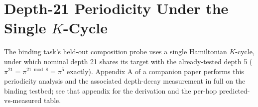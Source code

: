 \section{Depth-21 Periodicity Under the Single $K$-Cycle}
\label{app:period}

The binding task's held-out composition probe uses a single Hamiltonian
$K$-cycle, under which nominal depth 21 shares its target with the
already-tested depth 5 ($\pi^{21} = \pi^{21 \bmod 8} = \pi^5$ exactly).
Appendix A of a companion paper \citep{larson2026companion} performs
this periodicity analysis and the associated depth-decay measurement in
full on the binding testbed; see that appendix for the derivation and
the per-hop predicted-vs-measured table.
